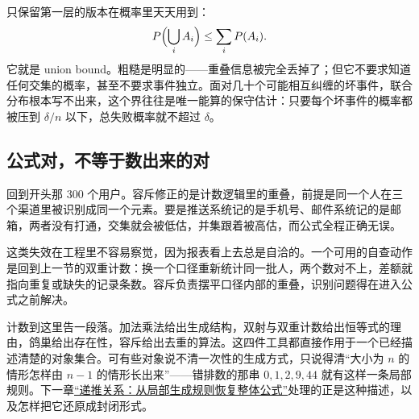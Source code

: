 只保留第一层的版本在概率里天天用到：
\[
P\Bigl(\bigcup_i A_i\Bigr)\le\sum_i P(A_i).
\]
它就是 union bound。粗糙是明显的——重叠信息被完全丢掉了；但它不要求知道任何交集的概率，甚至不要求事件独立。面对几十个可能相互纠缠的坏事件，联合分布根本写不出来，这个界往往是唯一能算的保守估计：只要每个坏事件的概率都被压到 \(\delta/n\) 以下，总失败概率就不超过 \(\delta\)。

\subsection{公式对，不等于数出来的对}

回到开头那 300 个用户。容斥修正的是计数逻辑里的重叠，前提是同一个人在三个渠道里被识别成同一个元素。要是推送系统记的是手机号、邮件系统记的是邮箱，两者没有打通，交集就会被低估，并集跟着被高估，而公式全程正确无误。

这类失效在工程里不容易察觉，因为报表看上去总是自洽的。一个可用的自查动作是回到上一节的双重计数：换一个口径重新统计同一批人，两个数对不上，差额就指向重复或缺失的记录条数。容斥负责摆平口径内部的重叠，识别问题得在进入公式之前解决。

计数到这里告一段落。加法乘法给出生成结构，双射与双重计数给出恒等式的理由，鸽巢给出存在性，容斥给出去重的算法。这四件工具都直接作用于一个已经描述清楚的对象集合。可有些对象说不清一次性的生成方式，只说得清``大小为 \(n\) 的情形怎样由 \(n-1\) 的情形长出来''——错排数的那串 \(0,1,2,9,44\) 就有这样一条局部规则。下一章\hyperref[ch:027]{``递推关系：从局部生成规则恢复整体公式''}处理的正是这种描述，以及怎样把它还原成封闭形式。
